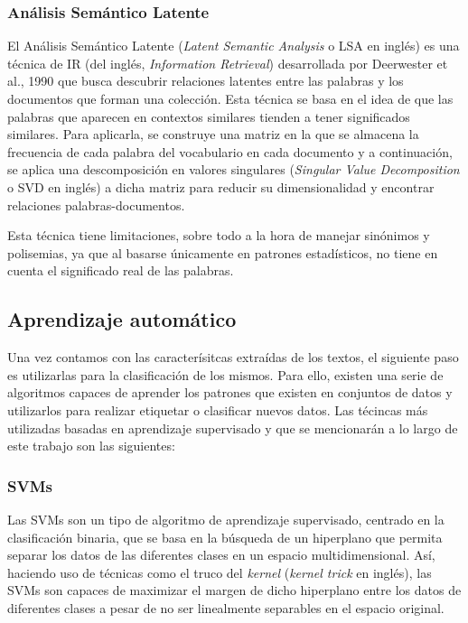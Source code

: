 \subsubsection{Análisis Semántico Latente}
\label{sec:analisis_semantico_latente}

El Análisis Semántico Latente (\textit{Latent Semantic Analysis} o LSA en inglés) es una técnica de IR (del inglés, \textit{Information Retrieval}) desarrollada por Deerwester et al., 1990 \cite{deerwester1990indexing}
que busca descubrir relaciones latentes
entre las palabras y los documentos que forman una colección. Esta técnica se basa
en el idea de que las palabras que aparecen en contextos similares
tienden a tener significados similares. Para aplicarla, se construye una matriz en la que se almacena la frecuencia de cada palabra del vocabulario en cada documento y
a continuación, se aplica una descomposición en valores singulares (\textit{Singular Value Decomposition} o SVD en inglés) a dicha matriz para reducir su dimensionalidad
y encontrar relaciones palabras-documentos.

\bigskip
Esta técnica tiene limitaciones, sobre todo a la hora de manejar sinónimos y polisemias, ya que al basarse únicamente en patrones estadísticos,
no tiene en cuenta el significado real de las palabras.

\subsection{Aprendizaje automático}
\label{sec:aprendizaje_automatico}

Una vez contamos con las caracterísitcas extraídas de los textos, el siguiente paso es utilizarlas para la clasificación de los mismos.
Para ello, existen una serie de algoritmos capaces de aprender los patrones que existen en conjuntos de datos y utilizarlos para realizar
etiquetar o clasificar nuevos datos. Las técincas más utilizadas basadas en aprendizaje supervisado y que se mencionarán a lo largo de este trabajo son las siguientes:

\subsubsection{SVMs}
\label{sec:svm}

Las SVMs son un tipo de algoritmo de aprendizaje supervisado, centrado en la clasificación binaria, que se basa en la búsqueda de un hiperplano
que permita separar los datos de las diferentes clases en un espacio multidimensional. Así, haciendo uso de técnicas como el truco del \textit{kernel}
(\textit{kernel trick} en inglés), las SVMs son capaces de maximizar el margen de dicho hiperplano entre los datos de diferentes clases a pesar de no ser linealmente
separables en el espacio original.

